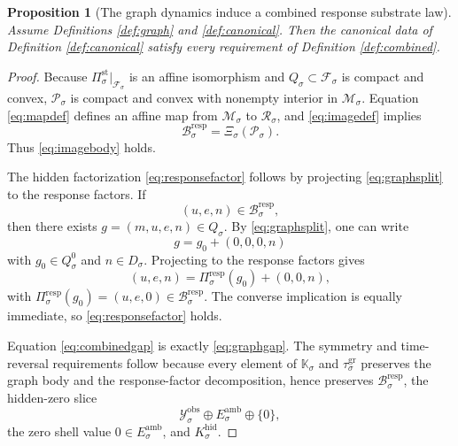 \documentclass[11pt]{article}
\newcommand{\DataSpace}[1]{\mathcal Y_{#1}^{\mathrm{obs}}}
\newcommand{\AmbientTarget}[1]{E_{#1}^{\mathrm{amb}}}
\newcommand{\ProtoSpace}[1]{\mathcal M_{#1}}
\newcommand{\ProtoBody}[1]{\mathcal P_{#1}}
\newcommand{\ResponseSpace}[1]{\mathcal R_{#1}}
\newcommand{\ResponseMap}[1]{\Xi_{#1}}
\newcommand{\ResponseImage}[1]{\mathcal B_{#1}^{\mathrm{resp}}}
\newcommand{\GapBody}[1]{D_{#1}}
\newcommand{\HiddenOperator}[1]{K_{#1}^{\mathrm{hid}}}
\newcommand{\GraphAffine}[1]{\mathcal F_{#1}}
\newcommand{\GraphBody}[1]{Q_{#1}}
\newcommand{\GraphZeroBody}[1]{Q_{#1}^{0}}
\newcommand{\StateProj}[1]{\Pi_{#1}^{\mathrm{st}}}
\newcommand{\RespProj}[1]{\Pi_{#1}^{\mathrm{resp}}}
\newcommand{\GraphSym}[1]{\mathbb K_{#1}}
\newcommand{\GraphTime}[1]{\tau_{#1}^{\mathrm{gr}}}
\newtheorem{proposition}{Proposition}
\begin{document}
\begin{proposition}[The graph dynamics induce a combined response substrate law]
\label{prop:derive}
Assume Definitions \ref{def:graph} and \ref{def:canonical}. Then the canonical data of Definition \ref{def:canonical} satisfy every requirement of Definition \ref{def:combined}.
\end{proposition}

\begin{proof}
Because \(\StateProj{\sigma}\big|_{\GraphAffine{\sigma}}\) is an affine isomorphism and \(\GraphBody{\sigma}\subset\GraphAffine{\sigma}\) is compact and convex, \(\ProtoBody{\sigma}\) is compact and convex with nonempty interior in \(\ProtoSpace{\sigma}\). Equation \eqref{eq:mapdef} defines an affine map from \(\ProtoSpace{\sigma}\) to \(\ResponseSpace{\sigma}\), and \eqref{eq:imagedef} implies
\[
\ResponseImage{\sigma}
=
\ResponseMap{\sigma}(\ProtoBody{\sigma}).
\]
Thus \eqref{eq:imagebody} holds.

The hidden factorization \eqref{eq:responsefactor} follows by projecting \eqref{eq:graphsplit} to the response factors. If
\[
(u,e,n)\in\ResponseImage{\sigma},
\]
then there exists \(g=(m,u,e,n)\in\GraphBody{\sigma}\). By \eqref{eq:graphsplit}, one can write
\[
g=g_{0}+(0,0,0,n)
\]
with \(g_{0}\in\GraphZeroBody{\sigma}\) and \(n\in\GapBody{\sigma}\). Projecting to the response factors gives
\[
(u,e,n)=\RespProj{\sigma}(g_{0})+(0,0,n),
\]
with \(\RespProj{\sigma}(g_{0})=(u,e,0)\in\ResponseImage{\sigma}\). The converse implication is equally immediate, so \eqref{eq:responsefactor} holds.

Equation \eqref{eq:combinedgap} is exactly \eqref{eq:graphgap}. The symmetry and time-reversal requirements follow because every element of \(\GraphSym{\sigma}\) and \(\GraphTime{\sigma}\) preserves the graph body and the response-factor decomposition, hence preserves \(\ResponseImage{\sigma}\), the hidden-zero slice
\[
\DataSpace{\sigma}\oplus \AmbientTarget{\sigma}\oplus\{0\},
\]
the zero shell value \(0\in\AmbientTarget{\sigma}\), and \(\HiddenOperator{\sigma}\).


\end{proof}
\end{document}
